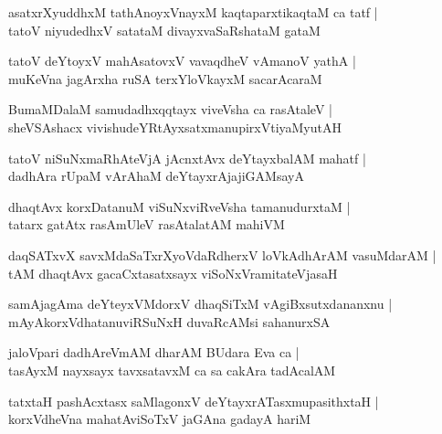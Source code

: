 \documentclass[twoside,12pt,openright]{book}
\newcounter{shloka}[chapter]
\begin{document}
\begin{shloka}%
asatxrXyuddhxM tathAnoyxVnayxM kaqtaparxtikaqtaM ca tatf |\\
tatoV niyudedhxV satataM divayxvaSaRshataM gataM 
\end{shloka}

\begin{shloka}%
tatoV deYtoyxV mahAsatovxV vavaqdheV vAmanoV yathA |\\
muKeVna jagArxha ruSA terxYloVkayxM sacarAcaraM 
\end{shloka}

\begin{shloka}%
BumaMDalaM samudadhxqqtayx viveVsha ca rasAtaleV |\\
sheVSAshacx vivishudeYRtAyxsatxmanupirxVtiyaMyutAH 
\end{shloka}

\begin{shloka}%
tatoV niSuNxmaRhAteVjA jAcnxtAvx deYtayxbalAM mahatf |\\
dadhAra rUpaM vArAhaM deYtayxrAjajiGAMsayA 
\end{shloka}

\begin{shloka}%
dhaqtAvx korxDatanuM viSuNxviRveVsha tamanudurxtaM |\\
tatarx gatAtx rasAmUleV rasAtalatAM mahiVM 
\end{shloka}

\begin{shloka}%
daqSATxvX savxMdaSaTxrXyoVdaRdherxV loVkAdhArAM vasuMdarAM |\\
tAM dhaqtAvx gacaCxtasatxsayx viSoNxVramitateVjasaH 
\end{shloka}

\begin{shloka}%
samAjagAma deYteyxVMdorxV dhaqSiTxM vAgiBxsutxdananxnu |\\
mAyAkorxVdhatanuviRSuNxH duvaRcAMsi sahanurxSA 
\end{shloka}

\begin{shloka}%
jaloVpari dadhAreVmAM dharAM BUdara Eva ca |\\
tasAyxM nayxsayx tavxsatavxM ca sa cakAra tadAcalAM
\end{shloka}

\begin{shloka}%
tatxtaH pashAcxtasx saMlagonxV deYtayxrATasxmupasithxtaH |\\
korxVdheVna mahatAviSoTxV jaGAna gadayA hariM 
\end{shloka}
\end{document}
